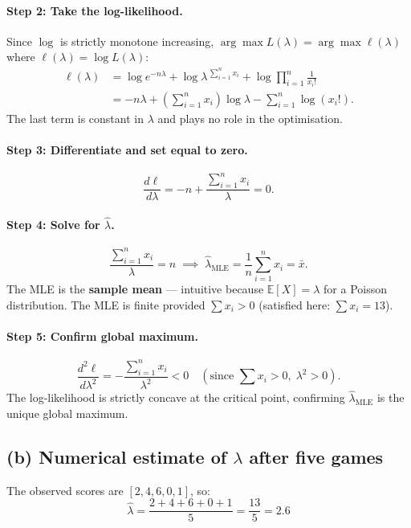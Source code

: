 \documentclass{article}
\begin{document}
\paragraph{Step 2: Take the log-likelihood.}
Since $\log$ is strictly monotone increasing, $\arg\max L(\lambda) = \arg\max \ell(\lambda)$
where $\ell(\lambda) = \log L(\lambda)$:
\begin{align*}
  \ell(\lambda)
  &= \log e^{-n\lambda}
     + \log \lambda^{\,\sum_{i=1}^n x_i}
     + \log \prod_{i=1}^n \frac{1}{x_i!} \\
  &= -n\lambda
     + \left(\sum_{i=1}^n x_i\right)\log\lambda
     - \sum_{i=1}^n \log(x_i!).
\end{align*}
The last term is constant in $\lambda$ and plays no role in the optimisation.

\paragraph{Step 3: Differentiate and set equal to zero.}
\[
  \frac{d\ell}{d\lambda}
  = -n + \frac{\displaystyle\sum_{i=1}^n x_i}{\lambda} = 0.
\]

\paragraph{Step 4: Solve for $\hat{\lambda}$.}
\[
  \frac{\displaystyle\sum_{i=1}^n x_i}{\lambda} = n
  \;\implies\;
  \boxed{\hat{\lambda}_{\text{MLE}} = \frac{1}{n}\sum_{i=1}^n x_i = \bar{x}.}
\]
The MLE is the \textbf{sample mean} --- intuitive because $\mathbb{E}[X] = \lambda$ for a Poisson
distribution. The MLE is finite provided $\sum x_i > 0$ (satisfied here: $\sum x_i = 13$).

\paragraph{Step 5: Confirm global maximum.}
\[
  \frac{d^2\ell}{d\lambda^2}
  = -\frac{\displaystyle\sum_{i=1}^n x_i}{\lambda^2} < 0
  \quad (\text{since } \textstyle\sum x_i > 0,\; \lambda^2 > 0).
\]
The log-likelihood is strictly concave at the critical point, confirming $\hat{\lambda}_{\text{MLE}}$
is the unique global maximum.

\subsection*{(b) Numerical estimate of $\lambda$ after five games}

The observed scores are $[2, 4, 6, 0, 1]$, so:
\[
\hat{\lambda} = \frac{2 + 4 + 6 + 0 + 1}{5} = \frac{13}{5} = 2.6
\]
\end{document}
